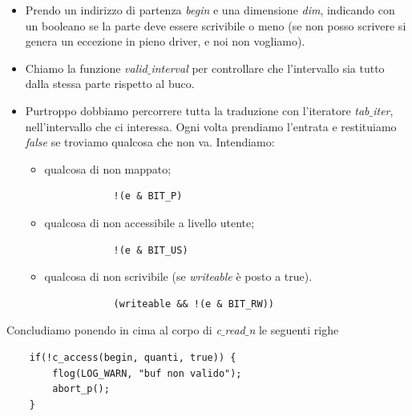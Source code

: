 \documentclass[11pt]{report}
\theoremstyle{definition}
\begin{document}
	\begin{itemize}
		\item Prendo un indirizzo di partenza \emph{begin} e una dimensione \emph{dim}, indicando con un booleano se la parte deve essere scrivibile o meno (se non posso scrivere si genera un eccezione in pieno driver, e noi non vogliamo).
		\item Chiamo la funzione \emph{valid$\_$interval} per controllare che l'intervallo sia tutto dalla stessa parte rispetto al buco. 
		\item Purtroppo dobbiamo percorrere tutta la traduzione con l'iteratore \emph{tab$\_$iter}, nell'intervallo che ci interessa. Ogni volta prendiamo l'entrata e restituiamo \emph{false} se troviamo qualcosa che non va. Intendiamo:
		\begin{itemize}
			\item qualcosa di non mappato;
			\begin{verbatim}
			!(e & BIT_P)
			\end{verbatim}
			\item qualcosa di non accessibile a livello utente;
			\begin{verbatim}
			!(e & BIT_US)
			\end{verbatim}
			\item qualcosa di non scrivibile (se \emph{writeable} è posto a true).
			\begin{verbatim}
			(writeable && !(e & BIT_RW))
			\end{verbatim}
		\end{itemize}
	\end{itemize}
	Concludiamo ponendo in cima al corpo di \emph{c$\_$read$\_$n} le seguenti righe
	\begin{verbatim}
	if(!c_access(begin, quanti, true)) {
	    flog(LOG_WARN, "buf non valido");
	    abort_p();	
	}
	\end{verbatim}
\end{document}
